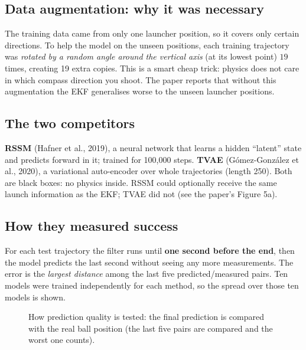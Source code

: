 \documentclass[11pt,a4paper]{article}
\begin{document}
\subsection{Data augmentation: why it was necessary}
The training data came from only one launcher position, so it covers only certain directions. To
help the model on the unseen positions, each training trajectory was \emph{rotated by a random angle
around the vertical axis} (at its lowest point) $19$ times, creating 19 extra copies. This is
a smart cheap trick: physics does not care in which compass direction you shoot. The paper reports
that without this augmentation the EKF generalises worse to the unseen launcher positions.

\subsection{The two competitors}
\textbf{RSSM} (Hafner et al., 2019), a neural network that learns a hidden ``latent'' state and
predicts forward in it; trained for 100,000 steps. \textbf{TVAE} (G\'omez-Gonz\'alez et al., 2020), a variational
auto-encoder over whole trajectories (length 250). Both are black boxes: no
physics inside. RSSM could optionally receive the same launch information as the EKF; TVAE did not (see the paper's Figure 5a).

\subsection{How they measured success}
For each test trajectory the filter runs until \textbf{one second before the end}, then the model
predicts the last second without seeing any more measurements. The error is the \emph{largest distance} among the last
five predicted/measured pairs. Ten models were trained independently for each method, so the
spread over those ten models is shown.

\begin{figure}[htbp]
\centering
{}
\caption{How prediction quality is tested: the final prediction is compared with the real ball
position (the last five pairs are compared and the worst one counts).}
\end{figure}
\end{document}
